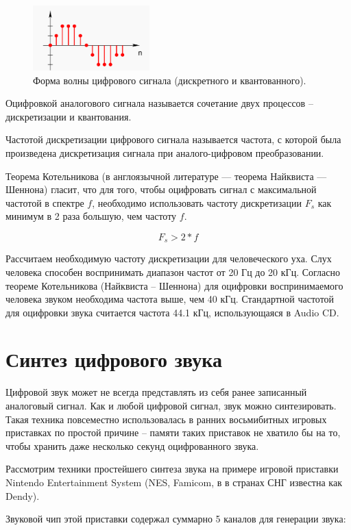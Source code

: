 \begin{figure}[H]
	\centering
	\includegraphics [width=0.4\textwidth] {images/lab_7/digital.png}
	\caption{Форма волны цифрового сигнала (дискретного и квантованного).}
	\label{lab7:pic3}
\end{figure}

Оцифровкой аналогового сигнала называется сочетание двух процессов -- дискретизации и квантования.

Частотой дискретизации цифрового сигнала называется частота, с которой была произведена дискретизация сигнала при аналого-цифровом преобразовании.

Теорема Котельникова (в англоязычной литературе — теорема Найквиста — Шеннона) гласит, что для того, чтобы оцифровать сигнал с максимальной частотой в спектре $f$, необходимо использовать частоту дискретизации $F_s$ как минимум в 2 раза большую, чем частоту $f$.

$$ F_s > 2*f $$

Рассчитаем необходимую частоту дискретизации для человеческого уха.
Слух человека способен воспринимать диапазон частот от 20 Гц до 20 кГц.
Согласно теореме Котельникова (Найквиста -- Шеннона) для оцифровки воспринимаемого человека звуком необходима частота выше, чем 40 кГц. Стандартной частотой для оцифровки звука считается частота 44.1 кГц, использующаяся в Audio CD.


\section{Синтез цифрового звука}

Цифровой звук может не всегда представлять из себя ранее записанный аналоговый сигнал.
Как и любой цифровой сигнал, звук можно синтезировать.
Такая техника повсеместно использовалась в ранних восьмибитных игровых приставках по простой причине -- памяти таких приставок не хватило бы на то, чтобы хранить даже несколько секунд оцифрованного звука.

Рассмотрим техники простейшего синтеза звука на примере игровой приставки Nintendo Entertainment System (NES, Famicom, в в странах СНГ известна как Dendy).

Звуковой чип этой приставки содержал суммарно 5 каналов для генерации звука:

